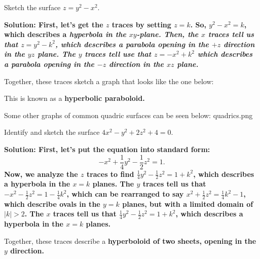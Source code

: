 \begin{example}
    Sketch the surface \(z = y^2-x^2\).\par\bf{Solution: }First, let's get the \(z\) traces by setting \(z=k\). So, \(y^2-x^2=k\), which describes a \it{hyperbola} in the \(xy\)-plane. 
    Then, the \(x\) traces tell us that \(z=y^2-k^2\), which describes a parabola opening in the \(+z\) direction in the \(yz\) plane. The \(y\) traces tell use that \(z=-x^2+k^2\) which describes a parabola opening in the \(-z\) direction in the \(xz\) plane. \par
    Together, these traces sketch a graph that looks like the one below:
    \begin{figure}[!h]
        \centering
    \end{figure}\par
    This is known as a \bf{hyperbolic paraboloid}.
\end{example}
\newpage
Some other graphs of common quadric surfaces can be seen below: {quadrics.png}
\begin{example}
    Identify and sketch the surface \(4x^2-y^2+2z^2+4=0\). \par\bf{Solution: }First, let's put the equation into standard form:
    \[-x^2+\frac{1}{4}y^2-\frac{1}{2}z^2=1.\]
    Now, we analyze the \(z\) traces to find \(\frac{1}{4}y^2-\frac{1}{2}z^2=1+k^2\), which describes a hyperbola in the \(x=k\) planes.
    The \(y\) traces tell us that \(-x^2-\frac{1}{2}z^2=1-\frac{1}{4}k^2\), which can be rearranged to say \(x^2+\frac{1}{2}z^2=\frac{1}{4}k^2-1\), which describe ovals in the \(y=k\) planes, but with a limited domain of \(|k|>2\).
    The \(x\) traces tell us that \(\frac{1}{4}y^2-\frac{1}{2}z^2=1+k^2\), which describes a hyperbola in the \(x=k\) planes.\par Together, these traces describe a \bf{hyperboloid of two sheets}, opening in the \(y\) direction.
\end{example}
